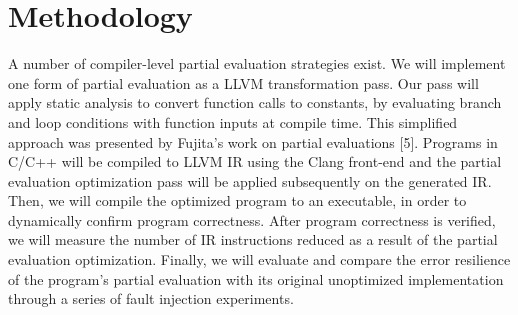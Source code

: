 \section{Methodology}

A number of compiler-level partial evaluation strategies exist.
We will implement one form of partial evaluation as a LLVM transformation pass.
Our pass will apply static analysis to convert function calls to constants, by evaluating branch and loop conditions with function inputs at compile time.
This simplified approach was presented by Fujita’s work on partial evaluations [5].
Programs in C/C++ will be compiled to LLVM IR using the Clang front-end and the partial evaluation optimization pass will be applied subsequently on the generated IR.
Then, we will compile the optimized program to an executable, in order to dynamically confirm program correctness.
After program correctness is verified, we will measure the number of IR instructions reduced as a result of the partial evaluation optimization.
Finally, we will evaluate and compare the error resilience of the program’s partial evaluation with its original unoptimized implementation through a series of fault injection experiments.
